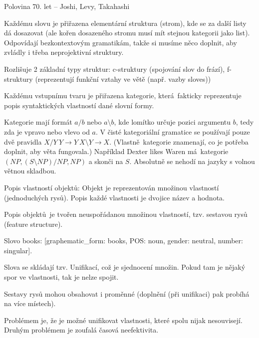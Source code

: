 \documentclass[12pt]{article}					%
\begin{document}
\begin{definice}
	Polovina 70. let – Joshi, Levy, Takahashi

	Každému slovu je přiřazena elementární struktura (strom), kde se za další listy dá dosazovat (ale kořen dosazeného stromu musí mít stejnou kategorii jako list). Odpovídají bezkontextovým gramatikám, takže si musíme něco doplnit, aby zvládly i třeba neprojektivní struktury.
\end{definice}

\begin{definice}
	Rozlišuje 2 základní typy struktur: c-struktury (spojování slov do frází), f-struktury (reprezentují funkční vztahy ve větě (např. vazby sloves))
\end{definice}

\begin{definice}
	Každému vstupnímu tvaru je přiřazena kategorie, která fakticky reprezentuje popis syntaktických vlastností dané slovní formy.

	Kategorie mají formát $a / b$ nebo $a \setminus b$, kde lomítko určuje pozici argumentu $b$, tedy zda je vpravo nebo vlevo od $a$. V čisté kategoriální gramatice se používají pouze dvě pravidla $X / Y\ Y \rightarrow Y\ X \setminus Y \rightarrow X$. (Vlastně kategorie znamenají, co je potřeba doplnit, aby věta fungovala.) Například Dexter likes Waren má kategorie $(NP, (S \setminus NP) / NP, NP)$ a skonči na $S$. Absolutně se nehodí na jazyky s volnou větnou skladbou.
\end{definice}

\begin{definice}
	Popis vlastností objektů: Objekt je reprezentován množinou vlastností (jednoduchých rysů). Popis každé vlastnosti je dvojice název a hodnota.

	Popis objektů je tvořen neuspořádanou množinou vlastností, tzv. sestavou rysů (feature structure).

	\begin{priklad}
		Slovo books: [graphematic\_form: books, POS: noun, gender: neutral, number: singular].
	\end{priklad}

	Slova se skládají tzv. Unifikací, což je sjednocení množin. Pokud tam je nějaký spor ve vlastnosti, tak je nelze spojit.

	Sestavy rysů mohou obsahovat i proměnné (doplnění (při unifikaci) pak probíhá na více místech).

	Problémem je, že je možné unifikovat vlastnosti, které spolu nijak nesouvisejí. Druhým problémem je zoufalá časová neefektivita.
\end{definice}
\end{document}
